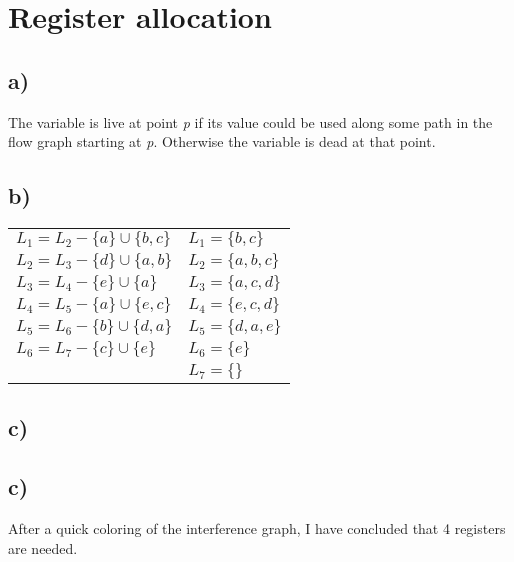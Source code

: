 \section{Register allocation}

\subsection*{a)}
The variable is live at point \emph{p} if its value could be used along some path in the flow graph starting at \emph{p}. Otherwise the variable is dead at that point. 

\subsection*{b)}
\begin{tabular}{l l}
$L_1 = L_2 - \{a\} \cup \{b, c\}$ 	& $L_1 = \{ b, c \}$	\\
$L_2 = L_3 - \{d\} \cup \{a, b\}$ 	& $L_2 = \{ a, b, c \}$\\
$L_3 = L_4 - \{e\} \cup \{a\}$ 		& $L_3 = \{ a, c, d \}$\\
$L_4 = L_5 - \{a\} \cup \{e, c\}$ 	& $L_4 = \{ e, c, d \}$\\
$L_5 = L_6 - \{b\} \cup \{d, a\}$ 	& $L_5 = \{ d, a, e \}$\\
$L_6 = L_7 - \{c\} \cup \{e\}$ 		& $L_6 = \{ e \}$	\\
					& $L_7 = \{ \}$	

\end{tabular}

\subsection*{c)}

\subsection*{c)}
After a quick coloring of the interference graph, I have concluded that 4 registers are needed. 

